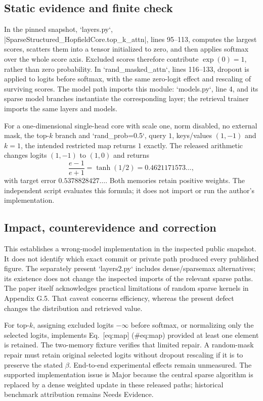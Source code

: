 \documentclass[10pt]{article}
\begin{document}
\subsection*{Static evidence and finite check}
In the pinned snapshot, `layers.py`, |SparseStructured\_HopfieldCore.top\_k\_attn|, lines 95–113, computes the largest scores, scatters them into a tensor initialized to zero, and then applies softmax over the whole score axis. Excluded scores therefore contribute \(\exp(0)=1\), rather than zero probability. In `rand\_masked\_attn`, lines 116–133, dropout is applied to logits before softmax, with the same zero-logit effect and rescaling of surviving scores. The model path imports this module: `models.py`, line 4, and its sparse model branches instantiate the corresponding layer; the retrieval trainer imports the same layers and models.\par
For a one-dimensional single-head core with scale one, norm disabled, no external mask, the top-\(k\) branch and `rand\_prob=0.5`, query \(1\), keys/values \((1,-1)\) and \(k=1\), the intended restricted map returns \(1\) exactly. The released arithmetic changes logits \((1,-1)\) to \((1,0)\) and returns \[\frac{e-1}{e+1}=\tanh(1/2)=0.4621171573\ldots,\] with target error \(0.5378828427\ldots\). Both memories retain positive weights. The independent script evaluates this formula; it does not import or run the author’s implementation.\par
\subsection*{Impact, counterevidence and correction}
This establishes a wrong-model implementation in the inspected public snapshot. It does not identify which exact commit or private path produced every published figure. The separately present `layers2.py` includes dense/sparsemax alternatives; its existence does not change the inspected imports of the relevant sparse paths. The paper itself acknowledges practical limitations of random sparse kernels in Appendix G.5. That caveat concerns efficiency, whereas the present defect changes the distribution and retrieved value.\par
For top-\(k\), assigning excluded logits \(-\infty\) before softmax, or normalizing only the selected logits, implements Eq. [eq:map] (\#eq:map) provided at least one element is retained. The two-memory fixture verifies that limited repair. A random-mask repair must retain original selected logits without dropout rescaling if it is to preserve the stated \(\beta\). End-to-end experimental effects remain unmeasured. The supported implementation issue is Major because the central sparse algorithm is replaced by a dense weighted update in these released paths; historical benchmark attribution remains Needs Evidence.\par
\end{document}
